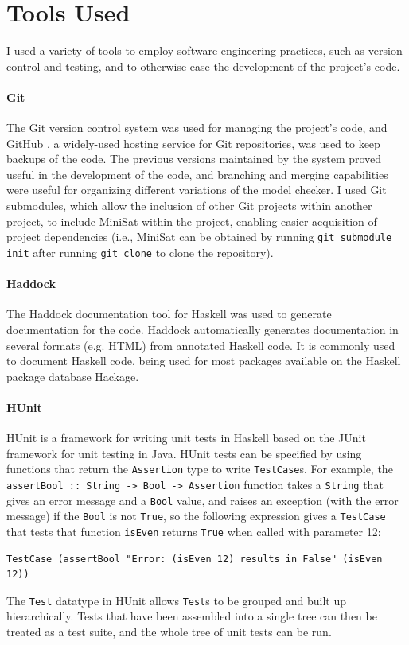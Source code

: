 \documentclass[12pt,a4paper,twoside,openright]{report}
\begin{document}
\section{Tools Used}
\label{prep:tools}

I used a variety of tools to employ software engineering practices, such
as version control and testing, and to otherwise ease the development of
the project's code.

\paragraph{Git}{
The Git version control system \cite{git}
was used for managing the project's code, and
GitHub \cite{github}, a widely-used hosting service for Git repositories, was used to
keep backups of the code.
The previous versions maintained by the system proved useful in
the development of the code, and branching and merging capabilities were
useful for organizing different variations of the model checker.
I used Git submodules, which allow the inclusion of other Git projects within another
project, to include MiniSat within the project, enabling easier
acquisition of project dependencies (i.e., MiniSat can be obtained by running
\verb,git submodule init, after running \verb,git clone, to clone the repository).}

\paragraph{Haddock}{
The Haddock \cite{haddock} documentation tool for Haskell was used to generate documentation
for the code. Haddock automatically generates documentation in
several formats (e.g. HTML) from annotated Haskell code. It is commonly
used to document Haskell code, being used for most packages available
on the Haskell package database Hackage.
}

\paragraph{HUnit}{
HUnit \cite{hunit} is a framework for writing unit tests in Haskell based on the
JUnit framework \cite{junit} for unit testing in Java.
HUnit tests can be specified by using functions
that return the \verb,Assertion, type to write \verb,TestCase,s. For example, the
\verb,assertBool :: String -> Bool -> Assertion, function takes a \verb,String,
that gives an error message and a \verb,Bool, value, and raises an exception (with
the error message) if the \verb,Bool, is not \verb,True,, so the
following expression gives a \verb,TestCase, that tests that function
\verb,isEven, returns \verb,True, when called with parameter 12:
\begin{lstlisting}
TestCase (assertBool "Error: (isEven 12) results in False" (isEven 12))
\end{lstlisting}

The \verb,Test, datatype in HUnit allows \verb,Test,s to be grouped
and built up hierarchically. Tests that have been assembled into a
single tree can then be treated as a test suite, and the whole tree
of unit tests can be run.}
\end{document}
